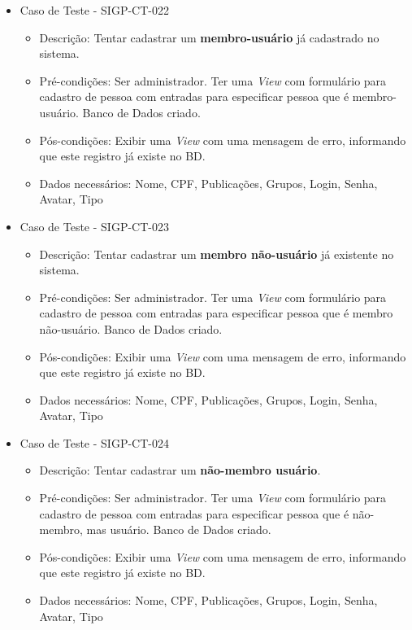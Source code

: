 \documentclass[11pt, a4paper]{book}
\begin{document}
\begin{itemize}
\item  Caso de Teste - SIGP-CT-022
	\begin{itemize}
	\item Descrição: Tentar cadastrar um \textbf{membro-usuário} já cadastrado no sistema.
	\item Pré-condições: Ser administrador. Ter uma \emph{View} com formulário para cadastro de pessoa com entradas para especificar pessoa que é membro-usuário. Banco de Dados criado.
	\item Pós-condições: Exibir uma \emph{View} com uma mensagem de erro, informando que este registro já existe no BD.
	\item Dados necessários: Nome, CPF, Publicações, Grupos, Login, Senha, Avatar, Tipo
	\end{itemize}

	\item Caso de Teste - SIGP-CT-023
	\begin{itemize}
	\item Descrição: Tentar cadastrar um \textbf{membro não-usuário} já existente no sistema.
	\item Pré-condições: Ser administrador. Ter uma \emph{View} com formulário para cadastro de pessoa com entradas para especificar pessoa que é membro não-usuário. Banco de Dados criado.
	\item Pós-condições: Exibir uma \emph{View} com uma mensagem de erro, informando que este registro já existe no BD.
	\item Dados necessários: Nome, CPF, Publicações, Grupos, Login, Senha, Avatar, Tipo
	\end{itemize}

\newpage

	\item Caso de Teste - SIGP-CT-024
	\begin{itemize}
	\item Descrição: Tentar cadastrar um \textbf{não-membro usuário}.
	\item Pré-condições: Ser administrador. Ter uma \emph{View} com formulário para cadastro de pessoa com entradas para especificar pessoa que é não-membro, mas usuário. Banco de Dados criado.
	\item Pós-condições: Exibir uma \emph{View} com uma mensagem de erro, informando que este registro já existe no BD.
	\item Dados necessários:  Nome, CPF, Publicações, Grupos, Login, Senha, Avatar, Tipo
	\end{itemize}


\end{itemize}
\end{document}
